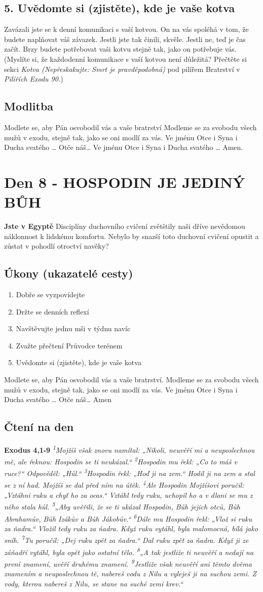 \documentclass[11pt]{article}
\newcommand{\zacatekDruhyTyden}{
  \textbf{Jste v Egyptě} \newline
  Disciplíny duchovního cvičení zvětštily naši dříve nevědomou náklonnost k lidskému komfortu.
  Nebylo by snazší toto duchovní cvičení opustit a zůstat v pohodlí otroctví navěky?

  \subsection*{Úkony (ukazatelé cesty)}
\begin{enumerate}
  \item Dobře se vyzpovídejte
  \item Držte se denních reflexí
  \item Navštěvujte jednu mši v týdnu navíc
  \item Zvažte přečtení Průvodce terénem
  \item Uvědomte si (zjistěte), kde je vaše kotva
\end{enumerate}
Modlete se, aby Pán osvobodil vás a vaše bratrství. \newline
Modleme se za svobodu všech mužů v exodu, stejně tak, jako se oni modlí za vás.\newline
Ve jménu Otce i Syna i Ducha svatého …  Otče náš… Amen
}
\begin{document}
\subsection*{5. Uvědomte si (zjistěte), kde je vaše kotva}
Zavázali jste se k denní komunikaci s vaší kotvou. On na vás spoléhá v tom, že budete naplňovat váš závazek. Jestli jste tak činili, skvěle. Jestli ne, teď je čas začít. Brzy budete potřebovat vaši kotvu stejně tak, jako on potřebuje vás. (Myslíte si, že každodenní komunikace s vaší kotvou není důležitá? Přečtěte si sekci \textit{Kotva (Nepřeskakujte: Smrt je pravděpodobná)} pod pilířem Bratrství v \textit{Pilířích Exodu 90.})

\subsection*{Modlitba}
Modlete se, aby Pán osvobodil vás a vaše bratrství \newline
Modleme se za svobodu všech mužů v exodu, stejně tak, jako se oni modlí za vás.\newline
Ve jménu Otce i Syna i Ducha svatého … Otče náš… Ve jménu Otce i Syna i Ducha svatého … Amen.

\newpage
\section{Den 8 - HOSPODIN JE JEDINÝ BŮH}
\zacatekDruhyTyden
\subsection*{Čtení na den}
\textbf{Exodus 4,1-9}
\newline
\textit{
\textsuperscript{1}Mojžíš však znovu namítal: „Nikoli, neuvěří mi a neuposlechnou mě, ale řeknou: Hospodin se ti neukázal.“
\textsuperscript{2}Hospodin mu řekl: „Co to máš v ruce?“ Odpověděl: „Hůl.“
\textsuperscript{3}Hospodin řekl: „Hoď ji na zem.“ Hodil ji na zem a stal se z ní had. Mojžíš se dal před ním na útěk.
\textsuperscript{4}Ale Hospodin Mojžíšovi poručil: „Vztáhni ruku a chyť ho za ocas.“ Vztáhl tedy ruku, uchopil ho a v dlani se mu z něho stala hůl.
\textsuperscript{5}„Aby uvěřili, že se ti ukázal Hospodin, Bůh jejich otců, Bůh Abrahamův, Bůh Izákův a Bůh Jákobův.“
\textsuperscript{6}Dále mu Hospodin řekl: „Vlož si ruku za ňadra.“ Vložil tedy ruku za ňadra. Když ruku vytáhl, byla malomocná, bílá jako sníh.
\textsuperscript{7}Tu poručil: „Dej ruku zpět za ňadra.“ Dal ruku zpět za ňadra. Když ji ze záňadří vytáhl, byla opět jako ostatní tělo.
\textsuperscript{8}„A tak jestliže ti neuvěří a nedají na první znamení, uvěří druhému znamení.
\textsuperscript{9}Jestliže však neuvěří ani těmto dvěma znamením a neuposlechnou tě, nabereš vodu z Nilu a vyleješ ji na suchou zemi. Z vody, kterou nabereš z Nilu, se stane na suché zemi krev.“
}
\end{document}
